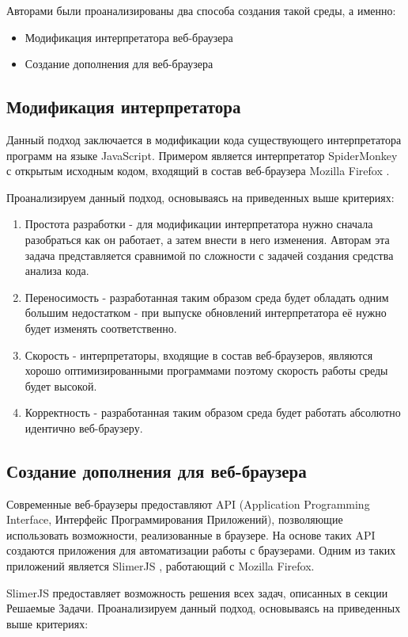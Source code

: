 	Авторами были проанализированы два способа создания такой среды, а именно:
	\begin{itemize}
		\item Модификация интерпретатора веб-браузера
		\item Создание дополнения для веб-браузера
	\end{itemize}

\subsection{Модификация интерпретатора}
	Данный подход заключается в модификации кода существующего интерпретатора программ на языке JavaScript. Примером является интерпретатор SpiderMonkey \cite{spidermonkey} с открытым исходным кодом, входящий в состав веб-браузера Mozilla Firefox \cite{mozilla}. 

	Проанализируем данный подход, основываясь на приведенных выше критериях:
	\begin{enumerate}
		\item Простота разработки - для модификации интерпретатора нужно сначала разобраться как он работает, а затем внести в него изменения. Авторам эта задача представляется сравнимой по сложности с задачей создания средства анализа кода.
		\item Переносимость - разработанная таким образом среда будет обладать одним большим недостатком - при выпуске обновлений интерпретатора её нужно будет изменять соответственно.
		\item Скорость - интерпретаторы, входящие в состав веб-браузеров, являются хорошо оптимизированными программами поэтому скорость работы среды будет высокой.
		\item Корректность - разработанная таким образом среда будет работать абсолютно идентично веб-браузеру.
	\end{enumerate}

\subsection{Создание дополнения для веб-браузера}
	Современные веб-браузеры предоставляют API (Application Programming Interface, Интерфейс Программирования Приложений), позволяющие использовать возможности, реализованные в браузере. На основе таких API создаются приложения для автоматизации работы с браузерами. Одним из таких приложений является SlimerJS \cite{slimer}, работающий с Mozilla Firefox. 


	SlimerJS предоставляет возможность решения всех задач, описанных в секции Решаемые Задачи. Проанализируем данный подход, основываясь на приведенных выше критериях:

